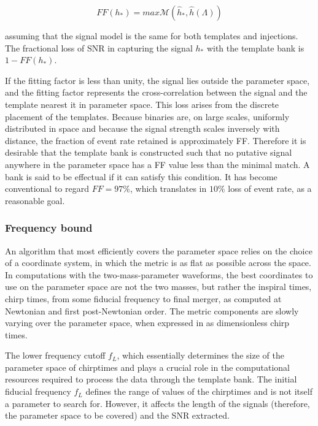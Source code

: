 \documentclass[binding=0.6cm, LaM]{sapthesis}
\begin{document}
		\begin{equation}
			FF(h_{*}) = max \mathcal{M}(\hat h_{*}, \hat h(\Lambda))
		\end{equation}

	assuming that the signal model is the same for both templates and injections. 
	The fractional loss of SNR in capturing the signal 
	$h_{*}$ with the template bank is $1 - FF(h_{*})$.

	If the fitting factor is less than unity, the signal lies outside the parameter space, 
	and the fitting factor represents the cross-correlation between 
	the signal and the template nearest it in parameter space. 
	This loss arises from the discrete placement of the templates. 
	Because binaries are, on large scales, uniformly distributed in space 
	and because the signal strength scales inversely with distance, 
	the fraction of event rate retained is approximately FF. 
	Therefore it is desirable that the template bank is constructed such that 
	no putative signal anywhere in the parameter space
	has a FF value less than the minimal match. 
	A bank is said to be effectual if it can satisfy this condition.
	It has become conventional to regard $FF = 97\%$, 
	which translates in $10\%$ loss of event rate, as a reasonable goal.


\subsubsection{Frequency bound}

	An algorithm that most efficiently covers the parameter space relies on the choice of a coordinate system, 
	in which the metric is as flat as possible across the space.
	In computations with the two-mass-parameter waveforms, 
	the best coordinates to use on the parameter space are not the two masses, 
	but rather the inspiral times, chirp times, from some fiducial frequency to final merger, 
	as computed at Newtonian and first post-Newtonian order. 
	The metric components are slowly varying over the parameter space, 
	when expressed in as dimensionless chirp times.
	

        The lower frequency cutoff $f_L$, which essentially determines the size of the parameter space
        of chirptimes and plays a crucial role in the computational resources required
        to process the data through the template bank.
        The initial fiducial frequency $f_L$ defines the range of values of the chirptimes
        and is not itself a parameter to search for.
        However, it affects the length of the signals
        (therefore, the parameter space to be covered) and the SNR extracted.
\end{document}
